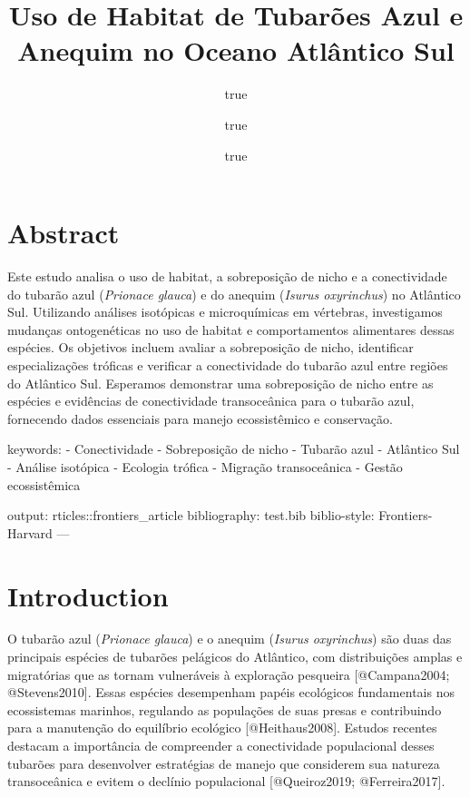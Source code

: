 \documentclass[
  utf8]{FrontiersinHarvard}
\title{Uso de Habitat de Tubarões Azul e Anequim no Oceano Atlântico
Sul}
\author{true \and true \and true}
\date{}
\begin{document}
\maketitle

\section*{Abstract}\label{abstract}

Este estudo analisa o uso de habitat, a sobreposição de nicho e a
conectividade do tubarão azul (\emph{Prionace glauca}) e do anequim
(\emph{Isurus oxyrinchus}) no Atlântico Sul. Utilizando análises
isotópicas e microquímicas em vértebras, investigamos mudanças
ontogenéticas no uso de habitat e comportamentos alimentares dessas
espécies. Os objetivos incluem avaliar a sobreposição de nicho,
identificar especializações tróficas e verificar a conectividade do
tubarão azul entre regiões do Atlântico Sul. Esperamos demonstrar uma
sobreposição de nicho entre as espécies e evidências de conectividade
transoceânica para o tubarão azul, fornecendo dados essenciais para
manejo ecossistêmico e conservação.

keywords: - Conectividade - Sobreposição de nicho - Tubarão azul -
Atlântico Sul - Análise isotópica - Ecologia trófica - Migração
transoceânica - Gestão ecossistêmica

output: rticles::frontiers\_article bibliography: test.bib biblio-style:
Frontiers-Harvard ---

\section*{Introduction}\label{introduction}

O tubarão azul (\emph{Prionace glauca}) e o anequim (\emph{Isurus
oxyrinchus}) são duas das principais espécies de tubarões pelágicos do
Atlântico, com distribuições amplas e migratórias que as tornam
vulneráveis à exploração pesqueira {[}@Campana2004; @Stevens2010{]}.
Essas espécies desempenham papéis ecológicos fundamentais nos
ecossistemas marinhos, regulando as populações de suas presas e
contribuindo para a manutenção do equilíbrio ecológico
{[}@Heithaus2008{]}. Estudos recentes destacam a importância de
compreender a conectividade populacional desses tubarões para
desenvolver estratégias de manejo que considerem sua natureza
transoceânica e evitem o declínio populacional {[}@Queiroz2019;
@Ferreira2017{]}.
\end{document}
